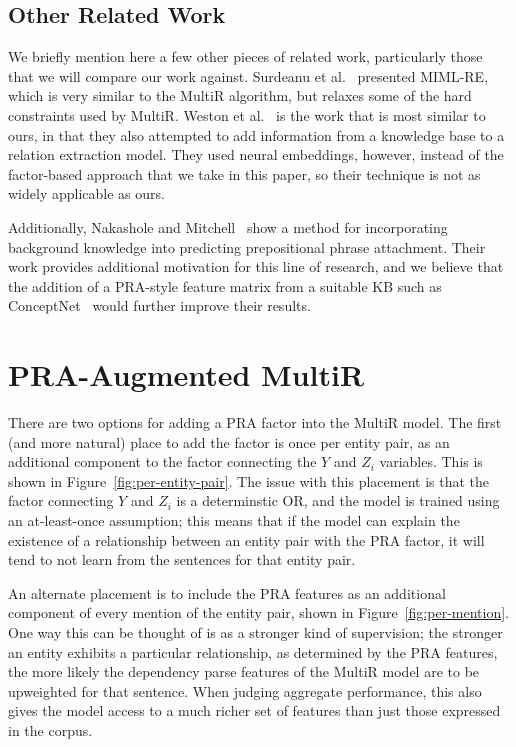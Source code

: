 \documentclass[11pt,a4paper]{article}
\newcommand{\figref}[1]{Figure~\ref{fig:#1}}
\begin{document}
\subsection{Other Related Work}
\label{sec:related-work}

We briefly mention here a few other pieces of related work, particularly those
that we will compare our work against.  Surdeanu et
al.~ presented MIML-RE, which is
very similar to the MultiR algorithm, but relaxes some of the hard constraints
used by MultiR.  Weston et
al.~ is the work that is most
similar to ours, in that they also attempted to add information from a
knowledge base to a relation extraction model.  They used neural embeddings,
however, instead of the factor-based approach that we take in this paper, so
their technique is not as widely applicable as ours.

Additionally, Nakashole and Mitchell~
show a method for incorporating background knowledge into predicting
prepositional phrase attachment.  Their work provides additional motivation
for this line of research, and we believe that the addition of a PRA-style
feature matrix from a suitable KB such as ConceptNet~\cite{conceptnet-2004}
would further improve their results.

\section{PRA-Augmented MultiR}
\label{sec:pra-augmented-multir}

There are two options for adding a PRA factor into the MultiR model.  The first
(and more natural) place to add the factor is once per entity pair, as an
additional component to the factor connecting the $Y$ and $Z_i$ variables.
This is shown in \figref{per-entity-pair}.  The issue with this placement is
that the factor connecting $Y$ and $Z_i$ is a determinstic OR, and the model is
trained using an at-least-once assumption; this means that if the model can
explain the existence of a relationship between an entity pair with the PRA
factor, it will tend to not learn from the sentences for that entity pair.

An alternate placement is to include the PRA features as an additional
component of every mention of the entity pair, shown in \figref{per-mention}.
One way this can be thought of is as a stronger kind of supervision; the
stronger an entity exhibits a particular relationship, as determined by the PRA
features, the more likely the dependency parse features of the MultiR model are
to be upweighted for that sentence.  When judging aggregate performance, this
also gives the model access to a much richer set of features than just those
expressed in the corpus.
\end{document}

